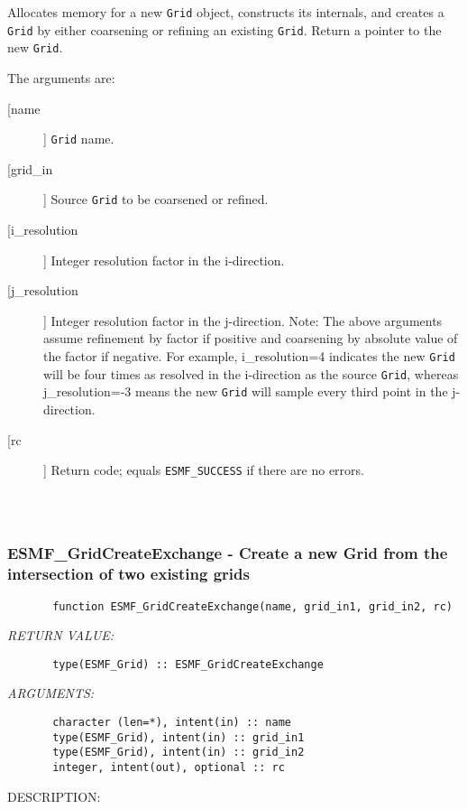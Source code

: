{       Allocates memory for a new {\tt Grid} object, constructs its
       internals, and creates a {\tt Grid} by either coarsening or refining an
       existing {\tt Grid}.  Return a pointer to the new {\tt Grid}.
  
       The arguments are:
       \begin{description}
       \item[[name]] 
            {\tt Grid} name.
       \item[[grid\_in]] 
            Source {\tt Grid} to be coarsened or refined.
       \item[[i\_resolution]] 
            Integer resolution factor in the i-direction.
       \item[[j\_resolution]] 
            Integer resolution factor in the j-direction.
            Note:  The above arguments assume refinement by factor if positive
            and coarsening by absolute value of the factor if negative.  For 
            example, i\_resolution=4 indicates the new {\tt Grid} will be four
            times as resolved in the i-direction as the source {\tt Grid},
            whereas j\_resolution=-3 means the new {\tt Grid} will sample every
            third point in the j-direction.
       \item[[rc]] 
            Return code; equals {\tt ESMF\_SUCCESS} if there are no errors.
     \end{description}
  
\begin{verbatim} \end{verbatim}
 
 
\mbox{}\hrulefill\ 
 
\subsubsection{ESMF\_GridCreateExchange - Create a new Grid from the intersection of two existing grids}


\begin{verbatim}       function ESMF_GridCreateExchange(name, grid_in1, grid_in2, rc)\end{verbatim}{\em RETURN VALUE:}
\begin{verbatim}       type(ESMF_Grid) :: ESMF_GridCreateExchange\end{verbatim}{\em ARGUMENTS:}
\begin{verbatim}       character (len=*), intent(in) :: name
       type(ESMF_Grid), intent(in) :: grid_in1
       type(ESMF_Grid), intent(in) :: grid_in2
       integer, intent(out), optional :: rc               \end{verbatim}
{\sf DESCRIPTION:\\ }


}
